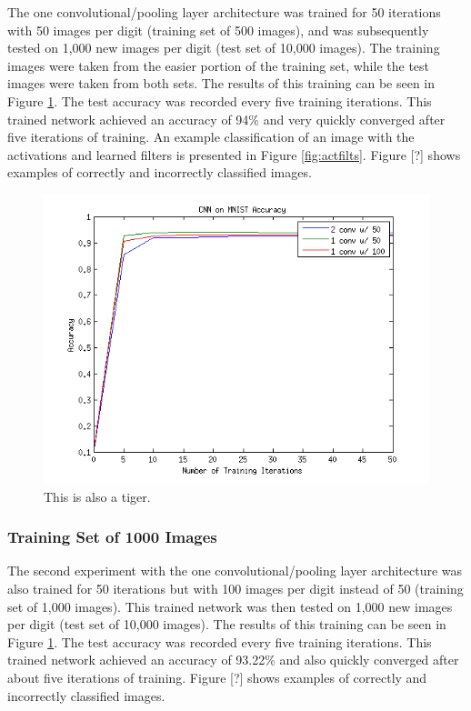 \documentclass[10pt,twocolumn,letterpaper]{article}
\begin{document}
The one convolutional/pooling layer architecture was trained for 50 iterations with 50 images per digit
(training set of 500 images), and was subsequently tested on
1,000 new images per digit (test set of 10,000 images).
The training images were taken from the easier portion of the training set, while the test images were taken from
both sets. The results of this training can be seen in Figure \ref{fig:accplot}. The test accuracy was recorded every five training
iterations. This trained network achieved an accuracy of 94\% and very quickly converged after five iterations of training. An example 
classification of an image with the activations and learned filters is presented
in Figure \ref{fig:actfilts}. Figure [?] shows examples of correctly and incorrectly classified images.

\begin{figure}
  \includegraphics[scale=0.55]{AccPlot}
  \caption{This is also a tiger.}
  \label{fig:accplot}
\end{figure}

\subsubsection{Training Set of 1000 Images}

The second experiment with the one convolutional/pooling layer architecture was also trained
for 50 iterations but with 100 images per digit instead of 50 (training set of 1,000 images).
This trained network was then tested on 1,000 new images per digit (test set of 10,000 images).
The results of this training can be seen in Figure \ref{fig:accplot}.
The test accuracy was recorded every five training iterations. This trained network achieved an accuracy of 93.22\% and also quickly converged after about five iterations of training.
Figure [?] shows examples of correctly and incorrectly classified images.
\end{document}
